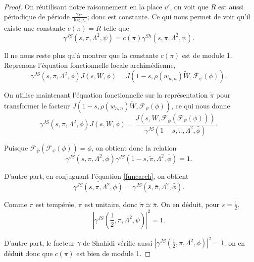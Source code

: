 \documentclass{amsart}
\begin{document}
\begin{proof}
  On réutilisant notre raisonnement en la place $v'$, on voit que $R$ est aussi périodique de période $\frac{2i\pi}{\log q_{v'}}$; donc est constante. Ce qui nous permet de voir qu'il existe une constante $c(\pi)=R$ telle que
 \begin{equation}
 \gamma^{JS}(s, \pi, \Lambda^2, \psi) = c(\pi)\gamma^{Sh}(s, \pi, \Lambda^2, \psi).
 \end{equation}
 
 Il ne nous reste plus qu'à montrer que la constante $c(\pi)$ est de module 1. Reprenons l'équation fonctionnelle locale archimédienne,
 \begin{equation}
 \label{funcarch}
 \gamma^{JS}(s, \pi, \Lambda^2, \phi) J(s, W, \phi) = J(1-s, \rho(w_{n,n})\tilde{W}, \mathcal{F}_\psi(\phi)).
 \end{equation}
 
 On utilise maintenant l'équation fonctionnelle sur la représentation $\tilde{\pi}$ pour transformer le facteur $J(1-s, \rho(w_{n,n})\tilde{W}, \mathcal{F}_\psi(\phi))$, ce qui nous donne
 \begin{equation}
 \gamma^{JS}(s, \pi, \Lambda^2, \phi) J(s, W, \phi) = \frac{J(s, W, \mathcal{F}_{\bar{\psi}}(\mathcal{F}_\psi(\phi)))}{\gamma^{JS}(1-s, \tilde{\pi}, \Lambda^2, \bar{\phi})}.
 \end{equation}
 
 Puisque $\mathcal{F}_{\bar{\psi}}(\mathcal{F}_\psi(\phi)) = \phi$, on obtient donc la relation 
 \begin{equation}
 \gamma^{JS}(s, \pi, \Lambda^2, \phi)\gamma^{JS}(1-s, \tilde{\pi}, \Lambda^2, \bar{\phi}) = 1.
 \end{equation}
 
 D'autre part, en conjuguant l'équation \ref{funcarch}, on obtient
 \begin{equation}
 \overline{\gamma^{JS}(s, \pi, \Lambda^2, \phi)} = \gamma^{JS}(\bar{s}, \bar{\pi}, \Lambda^2, \bar{\phi}).
 \end{equation}
 
 Comme $\pi$ est tempérée, $\pi$ est unitaire, donc $\tilde{\pi} \simeq \bar{\pi}$. On en déduit, pour $s = \frac{1}{2}$,
 \begin{equation}
 |\gamma^{JS}(\frac{1}{2}, \pi, \Lambda^2, \psi)|^2=1.
 \end{equation}
 
 D'autre part, le facteur $\gamma$ de Shahidi vérifie aussi $|\gamma^{JS}(\frac{1}{2}, \pi, \Lambda^2, \phi)|^2=1$; on en déduit donc que $c(\pi)$ est bien de module 1.
 \end{proof}
\end{document}
